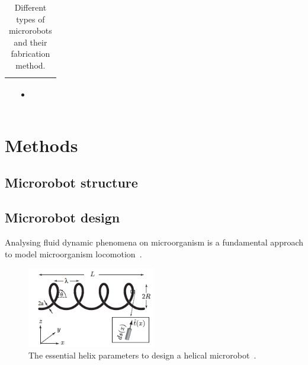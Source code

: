 \documentclass[12pt,a4paper,titlepage]{report}
\begin{document}
\begin{table}[h!]
\begin{tabular}{ c  m{3cm}  m{4.3cm} m{3cm} }
\begin{itemize}
      \end{itemize}
&
	   \begin{itemize}
        \item \citep{ko2012jellyfish}
   
      \end{itemize}
    \\ \hline



  \end{tabular}
  \caption{Different types of microrobots and their fabrication method.}\label{Micro}
\end{table}



\chapter{Methods}

\section{Microrobot structure}


\section{Microrobot design}

Analysing fluid dynamic phenomena on microorganism is a fundamental approach to model microorganism
 locomotion~\citep{smith2009boundary}.


\begin{figure}
  \begin{center}
    \includegraphics[width=0.5\textwidth]{parameters}
  \caption{The essential helix parameters to design a helical microrobot~\citep{rodenborn2013propulsion}.}
  \label{parameters}
\end{center}
\end{figure}
\end{document}
